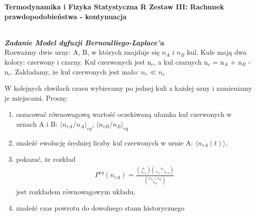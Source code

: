\documentclass[11pt,a4paper]{article}
\newcounter{zadanie}\newcommand{\zadanie}[1][]{\addtocounter{zadanie}{1} ~\\  {\bf \emph{Zadanie \arabic{zadanie} #1 }} \\}
\begin{document}
   

\begin{centering}
  {\bf {\Large
  Termodynamika i Fizyka Statystyczna R 
  Zestaw III: Rachunek prawdopodobieństwa - kontynuacja
  }} \\  
\end{centering}

\vspace{1cm}

\zadanie[Model dyfuzji Bernoulliego-Laplace'a]

Rozważmy dwie urny:  A, B, w których znajduje się
$n_A$ i $n_B$ kul. Kule mają dwa kolory: czerwony i czarny.
Kul czerwonych jest n$_{r}$, a kul czarnych n$_{c}$ = n$_{A}$ + n$_{B}$ - n$_{r}$.
Zakładamy, że kul czerwonych jest mało: $n_{r} \ll n_{c}$

W kolejnych chwilach czasu wybieramy po jednej kuli z każdej urny i zamieniamy je miejscami.
Proszę:
\begin{enumerate}
  \item oszacować równowagową wartość oczekiwaną ułamka 
        kul czerwonych w urnach A i B: $\langle n_{rA}/n_A \rangle_{eq}$,
        $\langle n_{rB}/n_B \rangle_{eq}$
  \item znaleźć ewolucję średniej liczby kul czerwonych w urnie A: 
        $\langle n_{rA}(t) \rangle$,
  \item pokazać, że rozkład
  \begin{align*}
    P^{eq}(n_{rA}) = \frac{\binom{n_r}{n_{rA}}\binom{n_c}{n_A - n_{rA}}}{\binom{n_A + n_B}{n_A}}
  \end{align*}
   jest rozkładem równowagowym układu,
   \item znaleźć czas powrotu do dowolnego stanu historycznego
\end{enumerate}
\end{document}
